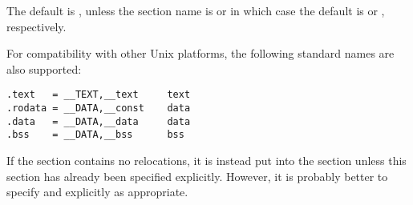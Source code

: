 The default is , unless the section name is  or
 in which case the default is  or ,
respectively.

For compatibility with other Unix platforms, the following standard
names are also supported:

\begin{lstlisting}
.text   = __TEXT,__text     text
.rodata = __DATA,__const    data
.data   = __DATA,__data     data
.bss    = __DATA,__bss      bss
\end{lstlisting}

If the  section contains no relocations, it is instead put
into the  section unless this section has already
been specified explicitly. However, it is probably better to specify
 and  explicitly as appropriate.

%
%
%
%
%
%
%
%
%
%
%
%
